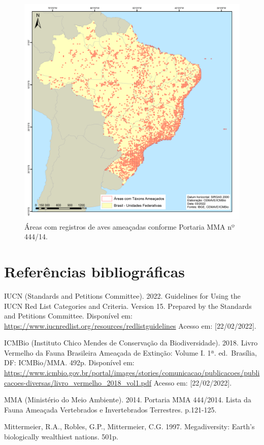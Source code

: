 \documentclass[
  oneside]{scrbook}
\begin{document}
\begin{figure}[H]

{\centering \includegraphics[width=0.7\linewidth]{imagens/cap03/Figura_3.3} 

}

\caption{Áreas com registros de aves ameaçadas conforme Portaria MMA nº 444/14.}\label{fig:11}
\end{figure}

\newpage

\hypertarget{referuxeancias-bibliogruxe1ficas-2}{%
\section{Referências bibliográficas}\label{referuxeancias-bibliogruxe1ficas-2}}

IUCN (Standards and Petitions Committee). 2022. Guidelines for Using the IUCN Red List Categories and Criteria. Version 15. Prepared by the Standards and Petitions Committee. Disponível em: \url{https://www.iucnredlist.org/resources/redlistguidelines} Acesso em: {[}22/02/2022{]}.

ICMBio (Instituto Chico Mendes de Conservação da Biodiversidade). 2018. Livro Vermelho da Fauna Brasileira Ameaçada de Extinção: Volume I. 1ª. ed.~Brasília, DF: ICMBio/MMA. 492p. Disponível em: \url{https://www.icmbio.gov.br/portal/images/stories/comunicacao/publicacoes/publicacoes-diversas/livro_vermelho_2018_vol1.pdf} Acesso em: {[}22/02/2022{]}.

MMA (Ministério do Meio Ambiente). 2014. Portaria MMA 444/2014. Lista da Fauna Ameaçada Vertebrados e Invertebrados Terrestres. p.121-125.

Mittermeier, R.A., Robles, G.P., Mittermeier, C.G. 1997. Megadiversity: Earth's biologically wealthiest nations. 501p.
\end{document}
